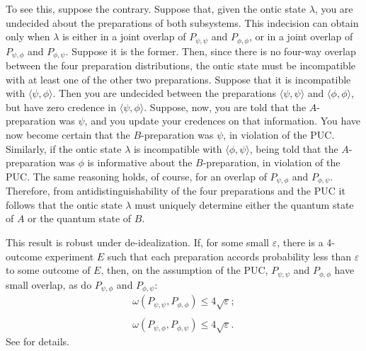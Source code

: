 \documentclass[12pt]{article}
\begin{document}
To see this, suppose the contrary.  Suppose that, given the ontic state $\lambda$, you are undecided about the preparations of both subsystems.  This indecision can obtain only when $\lambda$ is either in a joint overlap of $P_{\psi, \psi}$ and $P_{\phi, \phi}$, or in a joint overlap of $P_{\psi, \phi}$ and $P_{\phi, \psi}$.  Suppose it is the former.  Then, since there is no four-way overlap between the four preparation distributions, the ontic state must be incompatible with at least one of the other two preparations.  Suppose that it is incompatible with $\langle {\psi}, {\phi} \rangle$.  Then you are undecided between the preparations $\langle {\psi},{\psi} \rangle$ and $\langle {\phi}, {\phi} \rangle$, but have zero credence in $\langle {\psi}, {\phi} \rangle$.  Suppose, now, you are told that the $A$-preparation was ${\psi}$, and you update your credences on that information.  You have now become certain that the $B$-preparation was ${\psi}$, in violation of the PUC. Similarly, if the ontic state $\lambda$ is incompatible with $\langle {\phi}, {\psi} \rangle$, being told that the $A$-preparation was ${\phi}$ is informative about the $B$-preparation, in violation of the PUC.  The same reasoning holds,  of course,  for an overlap of   $P_{\psi, \phi}$ and $P_{\phi, \psi}$.  Therefore, from antidistinguishability of the four preparations and the PUC it follows that the ontic state $\lambda$ must uniquely determine either the quantum state of $A$ or the quantum state of $B$.

This result is robust under de-idealization.  If, for some small $\varepsilon$,  there is a 4-outcome experiment $E$ such that each preparation accords probability less than $\varepsilon$ to some outcome of $E$, then, on the assumption of the PUC,   $P_{\psi, \psi}$ and $P_{\phi, \phi}$ have small overlap, as do $P_{\psi, \phi}$ and $P_{\phi, \psi}$:
\begin{equation}
\begin{array}{l}
\omega(P_{\psi, \psi}, P_{\phi, \phi}) \leq 4 \sqrt{\varepsilon};
\\ \\
\omega(P_{\psi, \phi}, P_{\phi, \psi}) \leq 4 \sqrt{\varepsilon}.
\end{array}
\end{equation}
See \citet{MyrvoldPsiOnt} for details.
\end{document}
